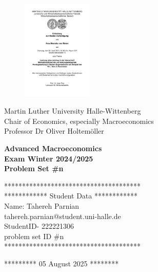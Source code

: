 \documentclass[12pt,a4paper,notitlepage]{article}
\numberwithin{equation}{section}
\begin{document}
\thispagestyle{empty}

\begin{figure}[H]
    \centering
    \includegraphics[width=0.3\textwidth]{LogoMLU.pdf}
\end{figure}

\begin{center}
    Martin Luther University Halle-Wittenberg \\
    Chair of Economics, especially Macroeconomics \\
    Professor Dr Oliver Holtemöller
\end{center}

\vspace*{3.5cm}

\begin{center}
    {\Huge\bf Advanced Macroeconomics} \\[0.5cm]
    {\Large\bf Exam Winter 2024/2025} \\[0.5cm]
    {\large\bf Problem Set \#n } \\[0.5cm]
\end{center}

\vspace*{3.5cm}

\noindent

	\vspace*{3.5cm}
	************************************** \\	
	************ Student Data ************ \\
	Name: Tahereh Parnian\\ tahereh.parnian@student.uni-halle.de\\StudentID- 222221306\\problem set ID \#n
 \\
	
	**************************************
	
	\vspace*{1cm}
	
	********* 05 August 2025 ********
	
\end{document}
